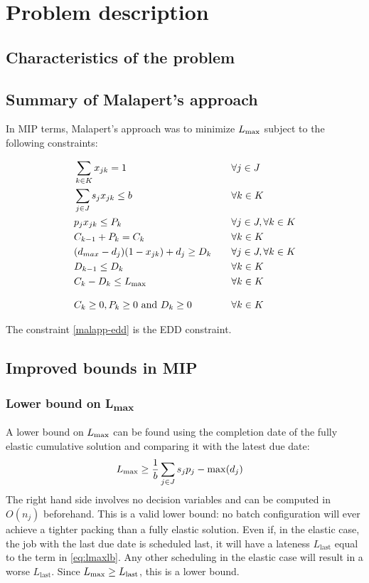 \documentclass[13pt, letterpaper, twoside]{book}
\begin{document}
\chapter{Problem description}
\section{Characteristics of the problem}
\section{Summary of Malapert's approach}
In MIP terms, Malapert's approach was to minimize $L_{\text{max}}$ subject to the following constraints:

\begin{alignat}{2}
  &\sum_{k \in K} x_{jk} = 1 \quad && \forall j \in J \\
  &\sum_{j \in J} s_j x_{jk} \leq b \quad && \forall k \in K\\
  &p_j x_{jk} \leq P_k \quad && \forall j \in J, \forall k \in K\\
  &C_{k-1} + P_{k} = C_k \quad && \forall k \in K\\
  &(d_{max} - d_j)(1 - x_{jk}) + d_j \geq D_k \quad && \forall j \in J, \forall k \in K\\
  &D_{k-1} \leq D_k \quad && \forall k \in K \label{malapp-edd} \\
  &C_k - D_k \leq L_{\text{max}} \quad && \forall k \in K\\[2ex]
  &C_k \geq 0, P_k \geq 0 \text{ and } D_k \geq 0 \quad && \forall k \in K  
\end{alignat}

The constraint \ref{malapp-edd} is the EDD constraint.

\section{Improved bounds in MIP}

\subsection{Lower bound on {\sansitalicfont L}\textsubscript{max}}

A lower bound on $L_{\text{max}}$ can be found using the completion date of the fully elastic cumulative solution and comparing it with the latest due date:
\begin{align}
& L_{\text{max}} \geq \frac{1}{b} \sum_{j \in J} s_j p_j - \mathrm{max}(d_j) \label{eq:lmaxlb}
\end{align}
The right hand side involves no decision variables and can be computed in $O(n_j)$ beforehand. This is a valid lower bound: no batch configuration will ever achieve a tighter packing than a fully elastic solution. Even if, in the elastic case, the job with the last due date is scheduled last, it will have a lateness $L_{\text{last}}$ equal to the term in \ref{eq:lmaxlb}. Any other scheduling in the elastic case will result in a worse $L_{\text{last}}$. Since $L_{\text{max}} \geq L_{\text{last}}$, this is a lower bound.
\end{document}
